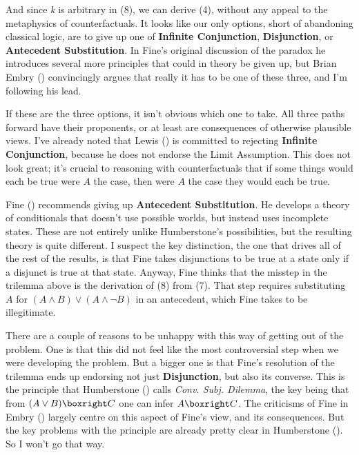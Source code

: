 \documentclass[
  11pt,
  letterpaper,
  DIV=11,
  numbers=noendperiod,
  twoside]{scrartcl}
\begin{document}
And since \emph{k} is arbitrary in (8), we can derive (4), without any
appeal to the metaphysics of counterfactuals. It looks like our only
options, short of abandoning classical logic, are to give up one of
\textbf{Infinite Conjunction}, \textbf{Disjunction}, or
\textbf{Antecedent Substitution}. In Fine's original discussion of the
paradox he introduces several more principles that could in theory be
given up, but Brian Embry () convincingly
argues that really it has to be one of these three, and I'm following
his lead.

If these are the three options, it isn't obvious which one to take. All
three paths forward have their proponents, or at least are consequences
of otherwise plausible views. I've already noted that Lewis
() is committed to rejecting
\textbf{Infinite Conjunction}, because he does not endorse the Limit
Assumption. This does not look great; it's crucial to reasoning with
counterfactuals that if some things would each be true were \(A\) the
case, then were \(A\) the case they would each be true.

Fine () recommends giving up
\textbf{Antecedent Substitution}. He develops a theory of conditionals
that doesn't use possible worlds, but instead uses incomplete states.
These are not entirely unlike Humberstone's possibilities, but the
resulting theory is quite different. I suspect the key distinction, the
one that drives all of the rest of the results, is that Fine takes
disjunctions to be true at a state only if a disjunct is true at that
state. Anyway, Fine thinks that the misstep in the trilemma above is the
derivation of (8) from (7). That step requires substituting \(A\) for
\((A \wedge B) \vee (A \wedge \neg B)\) in an antecedent, which Fine
takes to be illegitimate.

There are a couple of reasons to be unhappy with this way of getting out
of the problem. One is that this did not feel like the most
controversial step when we were developing the problem. But a bigger one
is that Fine's resolution of the trilemma ends up endorsing not just
\textbf{Disjunction}, but also its converse. This is the principle that
Humberstone () calls
\emph{Conv. Subj. Dilemma}, the key being that from
\((A \vee B) \boxright C\) one can infer \(A \boxright C\). The
criticisms of Fine in Embry () largely
centre on this aspect of Fine's view, and its consequences. But the key
problems with the principle are already pretty clear in Humberstone
(). So I won't go that
way.
\end{document}
